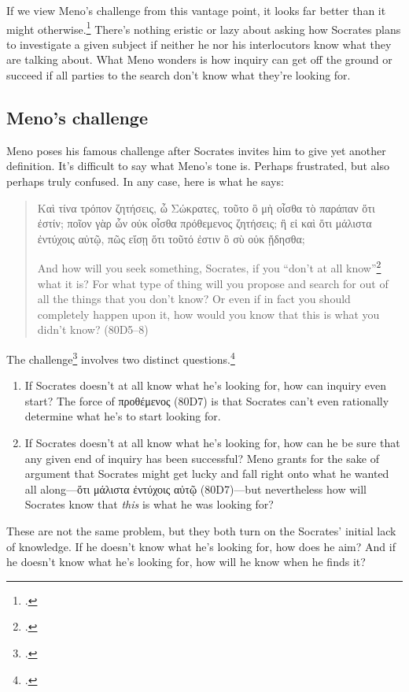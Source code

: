 If we view Meno's challenge from this vantage point, it looks far better than it might otherwise.\footcite[3 and 7]{nehamas1985} There's nothing eristic or lazy about asking how Socrates plans to investigate a given subject if neither he nor his interlocutors know what they are talking about. What Meno wonders is how inquiry can get off the ground or succeed if all parties to the search don't know what they're looking for.

\subsection{Meno's challenge}

Meno poses his famous challenge after Socrates invites him to give yet another definition. It's difficult to say what Meno's tone is. Perhaps frustrated, but also perhaps truly confused. In any case, here is what he says:

\begin{quote}
    {\g
    Καὶ τίνα τρόπον ζητήσεις, ὦ Σώκρατες, τοῦτο ὃ μὴ οἶσθα τὸ παράπαν ὅτι ἐστίν; ποῖον γὰρ ὧν οὐκ οἶσθα πρόθεμενος ζητήσεις; ἢ εἰ καὶ ὅτι μάλιστα ἐντύχοις αὐτῷ, πῶς εἴσῃ ὅτι τοῦτό ἐστιν ὃ σὺ οὐκ ᾔδησθα;
    }

    And how will you seek something, Socrates, if you ``don't at all know''\footcite[I've quoted this following Adam Beresford's translation in][because Meno appears to be throwing back at Socrates something that Socrates said at the start of the dialogue (71B1--8)]{protagorasmeno2005} what it is? For what type of thing will you propose and search for out of all the things that you don't know? Or even if in fact you should completely happen upon it, how would you know that this is what you didn't know? (80D5--8)
\end{quote}

The challenge\footcites[Most people call it a paradox, but for the reasons given by][I think it's better to call it something else.]{moline1969}[See, however,][25--27 for support of the term `paradox']{fine2014} involves two distinct questions.\footcite[][in Chapter 7, distinguishes between these as the problems of inquiry and discovery]{scott2006}

\begin{enumerate}
    \item If Socrates doesn't at all know what he's looking for, how can inquiry even start? The force of {\g προθέμενος} (80D7) is that Socrates can't even rationally determine what he's to start looking for.
    \item If Socrates doesn't at all know what he's looking for, how can he be sure that any given end of inquiry has been successful? Meno grants for the sake of argument that Socrates might get lucky and fall right onto what he wanted all along—{\g ὅτι μάλιστα ἐντύχοις αὐτῷ} (80D7)—but nevertheless how will Socrates know that \textit{this} is what he was looking for?
\end{enumerate}
These are not the same problem, but they both turn on the Socrates' initial lack of knowledge. If he doesn't know what he's looking for, how does he aim? And if he doesn't know what he's looking for, how will he know when he finds it?

